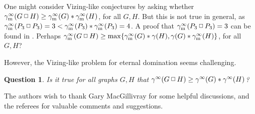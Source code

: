 \documentclass[12pt]{article}%
\newtheorem{question}[theorem]{Question}
\providecommand{\boksie}{\ensuremath{\mathbin{\raisebox{0.3mm}{$\scriptstyle\square$}}}}
\begin{document}
One might consider Vizing-like conjectures by asking whether $\gamma
_{\mathrm{m}}^{\infty}(G\boksie H)\geq\gamma_{\mathrm{m}}^{\infty}%
(G)\ast\gamma_{\mathrm{m}}^{\infty}(H)$, for all $G,H$. But this is not true
in general, as $\gamma_{\mathrm{m}}^{\infty}(P_{3}\boksie P_{3})=3<\gamma
_{\mathrm{m}}^{\infty}(P_{3})\ast\gamma_{\mathrm{m}}^{\infty}(P_{3})=4$. A
proof that $\gamma_{\mathrm{m}}^{\infty}(P_{3}\boksie P_{3})=3$ can be found
in \cite{GK2}. Perhaps $\gamma_{\mathrm{m}}^{\infty}(G\boksie H)\geq
\max\{\gamma_{\mathrm{m}}^{\infty}(G)\ast\gamma(H),\gamma(G)\ast
\gamma_{\mathrm{m}}^{\infty}(H)\}$, for all $G,H$?



However, the Vizing-like problem for eternal domination seems challenging.

\begin{question}
Is it true for all graphs $G,H$ that $\gamma^{\infty}(G\boksie H)\geq
\gamma^{\infty}(G)\ast\gamma^{\infty}(H)$?
\end{question}




The authors wish to thank Gary MacGillivray for some helpful discussions, and
the referees for valuable comments and suggestions.
\end{document}
